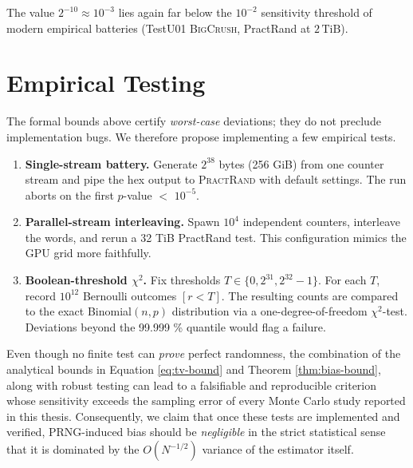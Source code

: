 The value \(2^{-10}\approx10^{-3}\) lies again far below the
\(10^{-2}\) sensitivity threshold of modern empirical batteries
(TestU01 \textsc{BigCrush}, PractRand at \(2\,\text{TiB}\)).

\section{Empirical Testing}
\label{sec:philox-testing}
The formal bounds above certify \emph{worst-case} deviations; they do
not preclude implementation bugs.  We therefore propose implementing a few empirical tests.

\begin{enumerate}[label=Step \arabic*., wide, labelwidth=!, labelindent=0pt]
  \item \textbf{Single-stream battery.}
        Generate \(2^{38}\) bytes (256 GiB) from one counter stream and
        pipe the hex output to \textsc{PractRand} with default settings.
        The run aborts on the first \(p\)-value \(<\) \(10^{-5}\).

  \item \textbf{Parallel-stream interleaving.}
        Spawn \(10^4\) independent counters,
        interleave the words, and rerun a 32 TiB PractRand test.
        This configuration mimics the GPU grid more faithfully.

  \item \textbf{Boolean-threshold \(\chi^{2}\).}
        Fix thresholds \(T\in\{0,2^{31},2^{32}-1\}\).
        For each \(T\), record \(10^{12}\) Bernoulli outcomes
        \([r<T]\).  The resulting counts are compared to the exact
        Binomial\((n,p)\) distribution via a one-degree-of-freedom
        \(\chi^{2}\)-test.  Deviations beyond the 99.999 \% quantile would flag
        a failure.
\end{enumerate}

Even though no finite test can \emph{prove} perfect randomness, the
combination of the analytical bounds in Equation \ref{eq:tv-bound} and Theorem \ref{thm:bias-bound}, along with robust testing can lead to a falsifiable and reproducible criterion whose sensitivity exceeds the sampling error of every Monte Carlo study reported in this thesis. Consequently, we claim that once these tests are implemented and verified, PRNG-induced bias should be \emph{negligible} in the strict
statistical sense that it is dominated by the \(O(N^{-1/2})\) variance
of the estimator itself.

